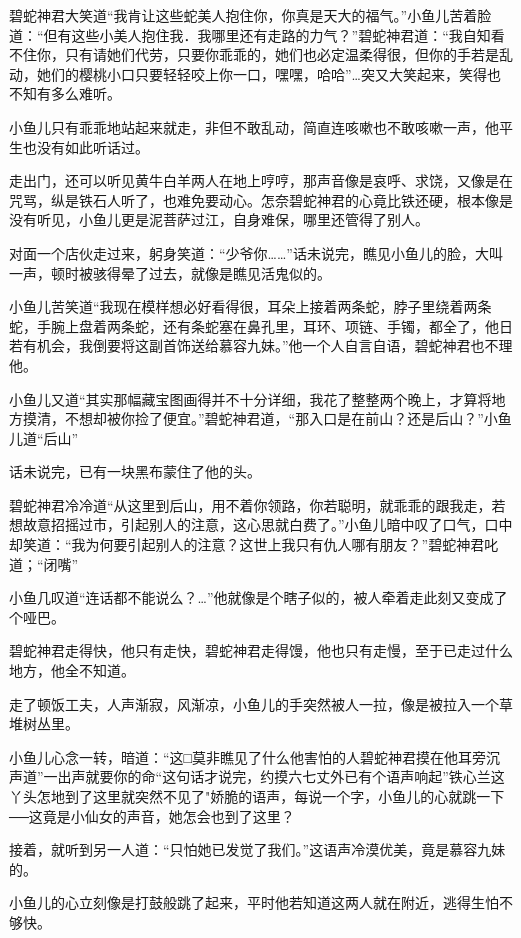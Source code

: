 \documentclass[12pt,oneside]{book}
\begin{document}
碧蛇神君大笑道``我肯让这些蛇美人抱住你，你真是天大的福气。''小鱼儿苦着脸道：``但有这些小美人抱住我．我哪里还有走路的力气？''碧蛇神君道：``我自知看不住你，只有请她们代劳，只要你乖乖的，她们也必定温柔得很，但你的手若是乱动，她们的樱桃小口只要轻轻咬上你一口，嘿嘿，哈哈''\ldots 突又大笑起来，笑得也不知有多么难听。

小鱼儿只有乖乖地站起来就走，非但不敢乱动，简直连咳嗽也不敢咳嗽一声，他平生也没有如此听话过。

走出门，还可以听见黄牛白羊两人在地上哼哼，那声音像是哀呼、求饶，又像是在咒骂，纵是铁石人听了，也难免要动心。怎奈碧蛇神君的心竟比铁还硬，根本像是没有听见，小鱼儿更是泥菩萨过江，自身难保，哪里还管得了别人。

对面一个店伙走过来，躬身笑道：``少爷你\ldots\ldots{}''话未说完，瞧见小鱼儿的脸，大叫一声，顿时被骇得晕了过去，就像是瞧见活鬼似的。

小鱼儿苦笑道``我现在模样想必好看得很，耳朵上接着两条蛇，脖子里绕着两条蛇，手腕上盘着两条蛇，还有条蛇塞在鼻孔里，耳环、项链、手镯，都全了，他日若有机会，我倒要将这副首饰送给慕容九妹。''他一个人自言自语，碧蛇神君也不理他。

小鱼儿又道``其实那幅藏宝图画得并不十分详细，我花了整整两个晚上，才算将地方摸清，不想却被你捡了便宜。''碧蛇神君道，``那入口是在前山？还是后山？''小鱼儿道``后山''

话未说完，已有一块黑布蒙住了他的头。

碧蛇神君冷冷道``从这里到后山，用不着你领路，你若聪明，就乖乖的跟我走，若想故意招摇过市，引起别人的注意，这心思就白费了。''小鱼儿暗中叹了口气，口中却笑道：``我为何要引起别人的注意？这世上我只有仇人哪有朋友？''碧蛇神君叱道；``闭嘴''

小鱼几叹道``连话都不能说么？\ldots{}''他就像是个瞎子似的，被人牵着走此刻又变成了个哑巴。

碧蛇神君走得快，他只有走快，碧蛇神君走得馒，他也只有走慢，至于已走过什么地方，他全不知道。

走了顿饭工夫，人声渐寂，风渐凉，小鱼儿的手突然被人一拉，像是被拉入一个草堆树丛里。

小鱼儿心念一转，暗道：``这□莫非瞧见了什么他害怕的人碧蛇神君摸在他耳旁沉声道''一出声就要你的命``这句话才说完，约摸六七丈外已有个语声响起''铁心兰这丫头怎地到了这里就突然不见了"娇脆的语声，每说一个字，小鱼儿的心就跳一下──这竟是小仙女的声音，她怎会也到了这里？

接着，就听到另一人道：``只怕她已发觉了我们。''这语声冷漠优美，竟是慕容九妹的。

小鱼儿的心立刻像是打鼓般跳了起来，平时他若知道这两人就在附近，逃得生怕不够快。
\end{document}
